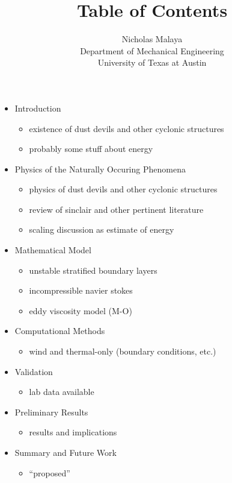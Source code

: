 \documentclass{article}
\title{\bf{Table of Contents}}
\author{Nicholas Malaya \\ Department of Mechanical Engineering \\ University of Texas at Austin} \date{}
\begin{document}
\maketitle

\begin{itemize}
 \item Introduction
       \begin{itemize}
	\item existence of dust devils and other cyclonic structures
	\item probably some stuff about energy
       \end{itemize}

 \item Physics of the Naturally Occuring Phenomena
       \begin{itemize} 
        \item physics of dust devils and other cyclonic structures
	\item review of sinclair and other pertinent literature
	\item scaling discussion as estimate of energy
       \end{itemize}

 \item Mathematical Model
       \begin{itemize}
	\item unstable stratified boundary layers
	\item incompressible navier stokes
	\item eddy viscosity model (M-O)
       \end{itemize}

 \item Computational Methods
       \begin{itemize}
	\item wind and thermal-only (boundary conditions, etc.)
       \end{itemize}

 \item Validation
       \begin{itemize}
	\item lab data available
       \end{itemize}

 \item Preliminary Results
       \begin{itemize}
	\item results and implications
       \end{itemize}
 \item Summary and Future Work
       \begin{itemize}
	\item ``proposed''
       \end{itemize}

\end{itemize}
\end{document}
